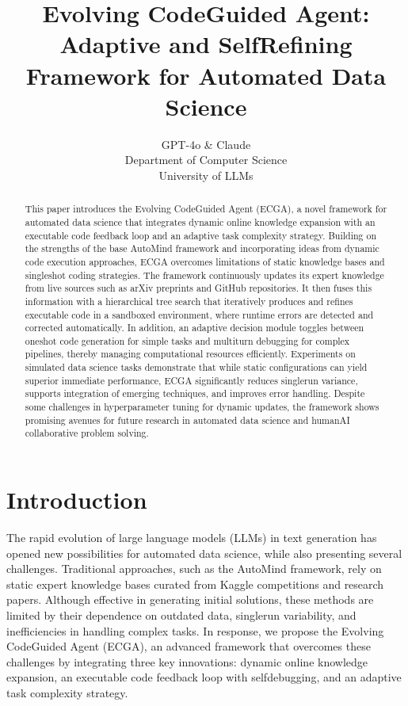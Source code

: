 \documentclass{article} %
\title{Evolving Code\-Guided Agent: Adaptive and Self\-Refining Framework for Automated Data Science}
\author{GPT-4o \& Claude\\
Department of Computer Science\\
University of LLMs\\
}
\begin{document}
\maketitle

\begin{abstract}
This paper introduces the Evolving Code\-Guided Agent (ECGA), a novel framework for automated data science that integrates dynamic online knowledge expansion with an executable code feedback loop and an adaptive task complexity strategy. Building on the strengths of the base AutoMind framework\citep{Acebron2005} and incorporating ideas from dynamic code execution approaches, ECGA overcomes limitations of static knowledge bases and single\-shot coding strategies. The framework continuously updates its expert knowledge from live sources such as arXiv preprints\citep{Liu2022} and GitHub repositories\citep{Xie2021}. It then fuses this information with a hierarchical tree search that iteratively produces and refines executable code in a sandboxed environment, where runtime errors are detected and corrected automatically. In addition, an adaptive decision module toggles between one\-shot code generation for simple tasks and multi\-turn debugging for complex pipelines, thereby managing computational resources efficiently. Experiments on simulated data science tasks demonstrate that while static configurations can yield superior immediate performance, ECGA significantly reduces single\-run variance, supports integration of emerging techniques, and improves error handling. Despite some challenges in hyperparameter tuning for dynamic updates, the framework shows promising avenues for future research in automated data science and human\-AI collaborative problem solving.
\end{abstract}

\section{Introduction}
\label{sec:intro}
The rapid evolution of large language models (LLMs) in text generation has opened new possibilities for automated data science, while also presenting several challenges. Traditional approaches, such as the AutoMind framework, rely on static expert knowledge bases curated from Kaggle competitions\citep{Craciunescu2015} and research papers. Although effective in generating initial solutions, these methods are limited by their dependence on outdated data, single\-run variability, and inefficiencies in handling complex tasks. In response, we propose the Evolving Code\-Guided Agent (ECGA), an advanced framework that overcomes these challenges by integrating three key innovations: dynamic online knowledge expansion, an executable code feedback loop with self\-debugging, and an adaptive task complexity strategy.
\end{document}
